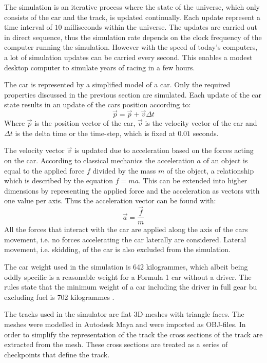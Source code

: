 The simulation is an iterative process where the state of the universe, which only consists of the car and the track, is updated continually. Each update represent a time interval of $10$ milliseconds within the universe. The updates are carried out in direct sequence, thus the simulation rate depends on the clock frequency of the computer running the simulation. However with the speed of today's computers, a lot of simulation updates can be carried every second. This enables a modest desktop computer to simulate years of racing in a few hours. 

The car is represented by a simplified model of a car. Only the required properties discussed in the previous section are simulated. Each update of the car state results in an update of the cars position according to:
\[
    \vec{p} = \vec{p} + \vec{v}\Delta t 
\]
Where $\vec{p}$ is the position vector of the car, $\vec{v}$ is the velocity vector of the car and $\Delta t$ is the delta time or the time-step, which is fixed at $0.01$ seconds.

The velocity vector $\vec{v}$ is updated due to acceleration based on the forces acting on the car. According to classical mechanics the acceleration $a$ of an object is equal to the applied force $f$ divided by the mass $m$ of the object, a relationship which is described by the equation $f = ma$. This can be extended into higher dimensions by representing the applied force and the acceleration as vectors with one value per axis. Thus the acceleration vector can be found with:
\[
\vec{a} = \frac{\vec{f}}{m}
\]
All the forces that interact with the car are applied along the axis of the cars movement, i.e. no forces accelerating the car laterally are considered. Lateral movement, i.e. skidding, of the car is also excluded from the simulation. 

The car weight used in the simulation is 642 kilogrammes, which albeit being oddly specific is a reasonable weight for a Formula 1 car without a driver. The rules state that the minimum weight of a car including the driver in full gear bu excluding fuel is 702 kilogrammes \cite{f1_weight}.



The tracks used in the simulator are flat 3D-meshes with triangle faces. The meshes were modelled in Autodesk Maya and were imported as OBJ-files. In order to simplify the representation of the track the cross sections of the track are extracted from the mesh. These cross sections are treated as a series of checkpoints that define the track.  

